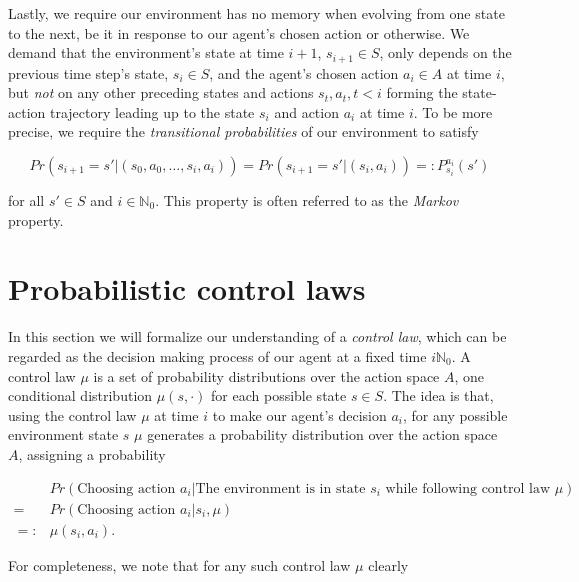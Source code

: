 \documentclass[11pt]{article} %
\begin{document}
Lastly, we require our environment has no memory when evolving from one state to the next, be it in response to our agent's chosen action or otherwise. We demand that the environment's state at time $i+1$, $s_{i+1} \in S$, only depends on the previous time step's state, $s_i \in S$, and the agent's chosen action $a_i \in A$ at time $i$, but \textit{not} on any other preceding states and actions $s_t, a_t, t < i$ forming the state-action trajectory leading up to the state $s_i$ and action $a_i$ at time $i$. To be more precise, we require the \textit{transitional probabilities} of our environment to satisfy

\begin{equation}\label{transProbMarkov}
	Pr(s_{i+1} = s' | (s_0, a_0, \dots, s_i, a_i)) = Pr(s_{i+1} = s' | (s_i,a_i)) =: P^{a_i}_{s_i} (s')
\end{equation}

for all $s' \in S$ and $i \in \mathbb{N}_0$. This property is often referred to as the \textit{Markov} property.

\section{Probabilistic control laws}

In this section we will formalize our understanding of a \textit{control law}, which can be regarded as the decision making process of our agent at a fixed time $i \mathbb{N}_0$. A control law $\mu$ is a set of probability distributions over the action space $A$, one conditional distribution $\mu(s, \cdot)$ for each possible state $s \in S$. The idea is that, using the control law $\mu$ at time $i$ to make our agent's decision $a_i$, for any possible environment state $s$ $\mu$ generates a probability distribution over the action space $A$, assigning a probability

\begin{equation}\label{controlProb}
	\begin{array}{ll}
			& 	Pr(\text{Choosing action }a_i | \text{The environment is in state } s_i \text{ while following control law }\mu) \\
		=	&	Pr(\text{Choosing action }a_i | s_i, \mu) \\
		=:	&	\mu(s_i, a_i).
	\end{array}
\end{equation}

For completeness, we note that for any such control law $\mu$ clearly 
\end{document}

